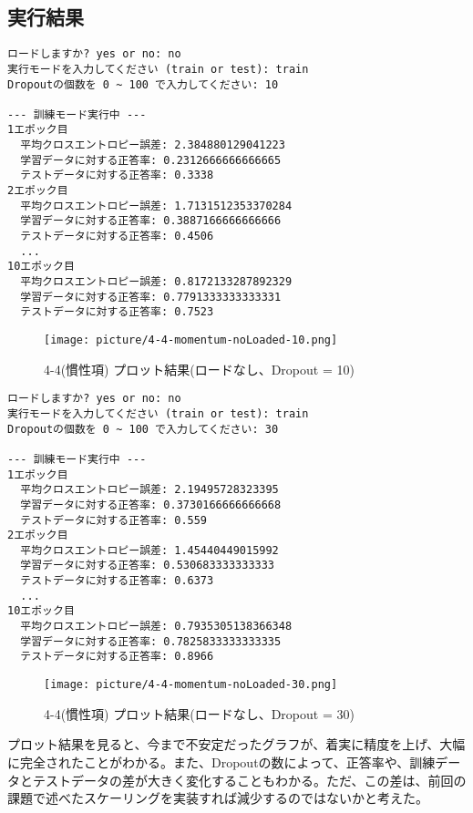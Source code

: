 \documentclass[11px,a4,dvipdfmx]{jsarticle}
\begin{document}
\subsection{実行結果}
\begin{verbatim}
ロードしますか? yes or no: no
実行モードを入力してください (train or test): train
Dropoutの個数を 0 ~ 100 で入力してください: 10

--- 訓練モード実行中 ---
1エポック目
  平均クロスエントロピー誤差: 2.384880129041223
  学習データに対する正答率: 0.2312666666666665
  テストデータに対する正答率: 0.3338
2エポック目
  平均クロスエントロピー誤差: 1.7131512353370284
  学習データに対する正答率: 0.3887166666666666
  テストデータに対する正答率: 0.4506
  ...
10エポック目
  平均クロスエントロピー誤差: 0.8172133287892329
  学習データに対する正答率: 0.7791333333333331
  テストデータに対する正答率: 0.7523
\end{verbatim}
 \begin{figure}[H]
		      \begin{center}
			      \texttt{[image: picture/4-4-momentum-noLoaded-10.png]}
			      \caption{4-4(慣性項) プロット結果(ロードなし、Dropout = 10)}
		      \end{center}
\end{figure}
\begin{verbatim}
ロードしますか? yes or no: no
実行モードを入力してください (train or test): train
Dropoutの個数を 0 ~ 100 で入力してください: 30

--- 訓練モード実行中 ---
1エポック目
  平均クロスエントロピー誤差: 2.19495728323395
  学習データに対する正答率: 0.3730166666666668
  テストデータに対する正答率: 0.559
2エポック目
  平均クロスエントロピー誤差: 1.45440449015992
  学習データに対する正答率: 0.530683333333333
  テストデータに対する正答率: 0.6373
  ...
10エポック目
  平均クロスエントロピー誤差: 0.7935305138366348
  学習データに対する正答率: 0.7825833333333335
  テストデータに対する正答率: 0.8966
\end{verbatim}
 \begin{figure}[H]
		      \begin{center}
			      \texttt{[image: picture/4-4-momentum-noLoaded-30.png]}
			      \caption{4-4(慣性項) プロット結果(ロードなし、Dropout = 30)}
		      \end{center}
\end{figure}
プロット結果を見ると、今まで不安定だったグラフが、着実に精度を上げ、大幅に完全されたことがわかる。また、Dropoutの数によって、正答率や、訓練データとテストデータの差が大きく変化することもわかる。ただ、この差は、前回の課題で述べたスケーリングを実装すれば減少するのではないかと考えた。
\end{document}
